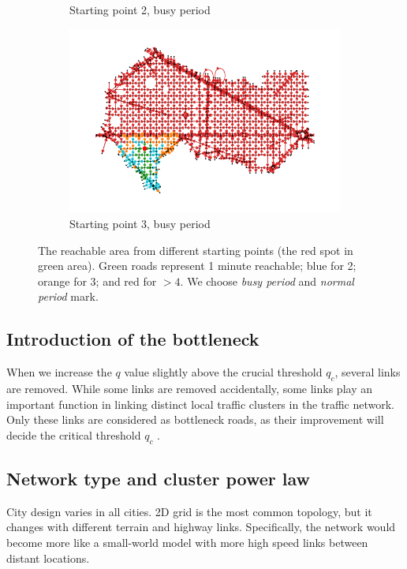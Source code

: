 \begin{figure}[hbt!]
\begin{subfigure}[t]{0.3\linewidth}
    \caption{Starting point 2, busy period}
    \label{fig: second busy reachable}
\end{subfigure}
\begin{subfigure}[t]{0.3\linewidth}
    \centering
    \includegraphics[width=\linewidth]{images/reachable/third_busy_1.png}
    \caption{Starting point 3, busy period}
    \label{fig: third busy reachable}
\end{subfigure}
\caption{The reachable area from different starting points (the red spot in green area). Green roads represent 1 minute reachable; blue for 2; orange for 3; and red for $>4$. We choose \textit{busy period} and \textit{normal period} mark.}
\hfill
\label{fig: reachable areas}
\end{figure}




\subsection{Introduction of the bottleneck}
When we increase the $q$ value slightly above the crucial threshold $q_c$, several links are removed. While some links are removed accidentally, some links play an important function in linking distinct local traffic clusters in the traffic network. Only these links are considered as bottleneck roads, as their improvement will decide the critical threshold $q_c$ \cite{li2015percolation}.


\subsection{Network type and cluster power law}
City design varies in all cities. 2D grid is the most common topology, but it changes with different terrain and highway links. Specifically, the network would become more like a small-world model with more high speed links between distant locations. 

